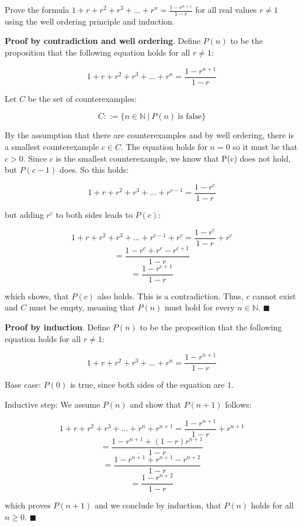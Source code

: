 \documentclass[../main.tex]{subfiles}
\begin{document}
\begin{questions}
\question Prove the formula $1 + r + r^2 + r^3 + ... + r^n = \frac{1-r^{n+1}}{1-r}$ for all real values $r\not=1$ using the well ordering principle and induction.
\begin{solution}

  \textbf{Proof by contradiction and well ordering}.
  Define $P(n)$ to be the proposition that the following equation holds for all $r\not=1$:

  $$
  1 + r + r^2 + r^3 + ... + r^n = \frac{1-r^{n+1}}{1-r}
  $$

  Let $C$ be the set of counterexamples:

  $$
  C ::= \{n \in \mathbb{N}\ |\ P(n)\ \text{is false}\}
  $$

  By the assumption that there are counterexamples and by well ordering, there is a smallest counterexample $c \in C$. The equation holds for $n=0$ so it must be that $c > 0$. Since $c$ is the smallest counterexample, we know that P(c) does not hold, but $P(c-1)$ does. So this holds:

  $$
  1 + r + r^2 + r^3 + ... + r^{c-1} = \frac{1-r^{c}}{1-r}
  $$

  but adding $r^c$ to both sides leads to $P(c)$:

  $$
  1 + r + r^2 + r^3 + ... + r^{c-1} + r^c = \frac{1-r^{c}}{1-r} + r^c
  $$
  $$
  = \frac{1-r^c+r^c-r^{c+1}}{1-r}
  $$
  $$
  = \frac{1-r^{c+1}}{1-r}
  $$

  which shows, that $P(c)$ also holds. This is a contradiction. Thus, $c$ cannot exist and $C$ must be empty, meaning that $P(n)$ must hold for every $n \in \mathbb{N}$. $\blacksquare$

  \textbf{Proof by induction}.
  Define $P(n)$ to be the proposition that the following equation holds for all $r\not=1$:

  $$
  1 + r + r^2 + r^3 + ... + r^n = \frac{1-r^{n+1}}{1-r}
  $$

  Base case: $P(0)$ is true, since both sides of the equation are $1$.

  Inductive step: We assume $P(n)$ and show that $P(n+1)$ follows:

  $$
  1 + r + r^2 + r^3 + ... + r^n + r^{n+1} = \frac{1-r^{n+1}}{1-r} + r^{n+1}
  $$
  $$
  = \frac{1-r^{n+1}+(1-r)r^{n+1}}{1-r}
  $$
  $$
  = \frac{1-r^{n+1}+r^{n+1}-r^{n+2}}{1-r}
  $$
  $$
  = \frac{1-r^{n+2}}{1-r}
  $$

  which proves $P(n+1)$ and we conclude by induction, that $P(n)$ holds for all $n \ge 0$. $\blacksquare$
\end{solution}
\end{questions}
\end{document}
